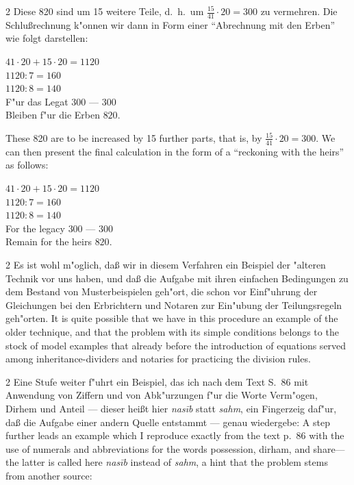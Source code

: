 \documentclass[10pt,a4paper]{article}
\renewcommand{\switchcolumn}{\syncronize\nointerlineskip\columnbreak}
\newcommand{\enquote}[1]{``#1''}
\begin{document}
\begin{paracol}{2}
Diese 820 sind um 15 weitere Teile, d.\ h.\ um $\frac{15}{41} \cdot 20 = 300$ zu vermehren. Die Schlu\ss{}rechnung k"onnen wir dann in Form einer \enquote{Abrechnung mit den Erben} wie folgt darstellen:
\begin{center}
$41 \cdot 20 + 15 \cdot 20 = 1120$\\
$1120 : 7 = 160$\\
$1120 : 8 = 140$\\
F"ur das Legat $300$ --- $300$\\
Bleiben f"ur die Erben $820$.
\end{center}
\switchcolumn
These 820 are to be increased by 15 further parts, that is, by $\frac{15}{41} \cdot 20 = 300$. We can then present the final calculation in the form of a ``reckoning with the heirs'' as follows:
\begin{center}
$41 \cdot 20 + 15 \cdot 20 = 1120$\\
$1120 : 7 = 160$\\
$1120 : 8 = 140$\\
For the legacy $300$ --- $300$\\
Remain for the heirs $820$.
\end{center}
\end{paracol}

\begin{paracol}{2}
Es ist wohl m"oglich, da\ss{} wir in diesem Verfahren ein Beispiel der "alteren Technik vor uns haben, und da\ss{} die Aufgabe mit ihren einfachen Bedingungen zu dem Bestand von Musterbeispielen geh"ort, die schon vor Einf"uhrung der Gleichungen bei den Erbrichtern und Notaren zur Ein"ubung der Teilungsregeln geh"orten.
\switchcolumn
It is quite possible that we have in this procedure an example of the older technique, and that the problem with its simple conditions belongs to the stock of model examples that already before the introduction of equations served among inheritance-dividers and notaries for practicing the division rules.
\end{paracol}

\begin{paracol}{2}
Eine Stufe weiter f"uhrt ein Beispiel, das ich nach dem Text S.\ 86 mit Anwendung von Ziffern und von Abk"urzungen f"ur die Worte Verm"ogen, Dirhem und Anteil --- dieser hei\ss{}t hier \textit{nas\={i}b} statt \textit{sahm}, ein Fingerzeig daf"ur, da\ss{} die Aufgabe einer andern Quelle entstammt --- genau wiedergebe:
\switchcolumn
A step further leads an example which I reproduce exactly from the text p.\ 86 with the use of numerals and abbreviations for the words possession, dirham, and share---the latter is called here \textit{nas\={i}b} instead of \textit{sahm}, a hint that the problem stems from another source:
\end{paracol}
\end{document}
